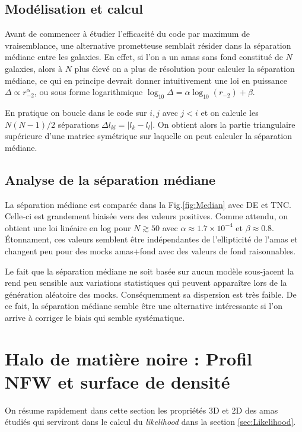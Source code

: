 \documentclass[a4paper,11pt]{article}
\numberwithin{equation}{section}
\begin{document}
    \subsection{Modélisation et calcul}
      Avant de commencer à étudier l'efficacité du code par maximum de vraisemblance, une alternative prometteuse semblait résider dans la séparation médiane entre les galaxies. En effet, si l'on a un amas sans fond constitué de $N$ galaxies, alors à $N$ plus élevé on a plus de résolution pour calculer la séparation médiane, ce qui en principe devrait donner intuitivement une loi en puissance $\Delta \propto r_{-2}^{\alpha}$, ou sous forme logarithmique $\log_{10} \Delta = \alpha \log_{10} (r_{-2}) + \beta$. \par
      En pratique on boucle dans le code sur $i,j$ avec $j<i$ et on calcule les $N(N-1)/2$ séparations $\Delta l_{kl} = \vert l_k - l_l \vert$. 
      On obtient alors la partie triangulaire supérieure d'une matrice symétrique sur laquelle on peut calculer la séparation médiane.
    \subsection{Analyse de la séparation médiane}
  	  La séparation médiane est comparée dans la Fig.\ref{fig:Median} avec DE et TNC. Celle-ci est grandement biaisée vers des valeurs positives. Comme attendu, on obtient une loi linéaire en log pour $N \gtrsim 50$ avec $\alpha \approx 1.7 \times 10^{-4}$ et $\beta \approx 0.8$. Étonnament, ces valeurs semblent être indépendantes de l'ellipticité de l'amas et changent peu pour des mocks amas+fond avec des valeurs de fond raisonnables. \par
  	  Le fait que la séparation médiane ne soit basée sur aucun modèle sous-jacent la rend peu sensible aux variations statistiques qui peuvent apparaître lors de la génération aléatoire des mocks. Conséquemment sa dispersion est très faible. De ce fait, la séparation médiane semble être une alternative intéressante si l'on arrive à corriger le biais qui semble systématique.
  	
  \newpage
  \section{Halo de matière noire : Profil NFW et surface de densité}
    On résume rapidement dans cette section les propriétés 3D et 2D des amas étudiés qui serviront dans le calcul du \textit{likelihood} dans la section \ref{sec:Likelihood}.
  
\end{document}
